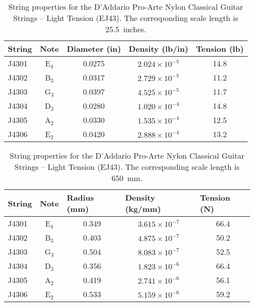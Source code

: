 \begin{table}[htbp]
  \centering
  \caption{\label{tbl:ej43_ips} String properties for the D'Addario Pro-Arte Nylon Classical Guitar Strings -- Light Tension (EJ43). The corresponding scale length is 25.5~inches.}
    \begin{tabular}{lcccc}
    \hline \hline
    String  & Note  & \multicolumn{1}{l}{Diameter (in)} & \multicolumn{1}{l}{Density (lb/in)} & \multicolumn{1}{l}{Tension (lb)} \\
    \hline
    J4301 & E$_4$  & 0.0275 & $2.024 \times 10^{-5}$ & 14.8 \\
    J4302 & B$_3$  & 0.0317 & $2.729 \times 10^{-5}$ & 11.2 \\
    J4303 & G$_3$  & 0.0397 & $4.525 \times 10^{-5}$ & 11.7 \\
    J4304 & D$_3$  & 0.0280 & $1.020 \times 10^{-4}$ & 14.8 \\
    J4305 & A$_2$  & 0.0330 & $1.535 \times 10^{-4}$ & 12.5 \\
    J4306 & E$_2$  & 0.0420 & $2.888 \times 10^{-4}$ & 13.2 \\
    \hline
    \end{tabular}%
  \label{tab:addlabel}%
\end{table}%

\begin{table}[htbp]
  \centering
  \caption{\label{tbl:ej43_mks} String properties for the D'Addario Pro-Arte Nylon Classical Guitar Strings -- Light Tension (EJ43). The corresponding scale length is 650~mm.}
    \begin{tabular}{lcccc}
    \hline \hline
    String  & Note  & \multicolumn{1}{l}{Radius (mm)} & \multicolumn{1}{l}{Density (kg/mm)} & \multicolumn{1}{l}{Tension (N)} \\
    \hline
    J4301 & E$_4$  & 0.349 & $3.615 \times 10^{-7}$ & 66.4 \\
    J4302 & B$_3$  & 0.403 & $4.875 \times 10^{-7}$ & 50.2 \\
    J4303 & G$_3$  & 0.504 & $8.083 \times 10^{-7}$ & 52.5 \\
    J4304 & D$_3$  & 0.356 & $1.823 \times 10^{-6}$ & 66.4 \\
    J4305 & A$_2$  & 0.419 & $2.741 \times 10^{-6}$ & 56.1 \\
    J4306 & E$_2$  & 0.533 & $5.159 \times 10^{-6}$ & 59.2 \\
    \hline
    \end{tabular}%
  \label{tab:addlabel}%
\end{table}%

